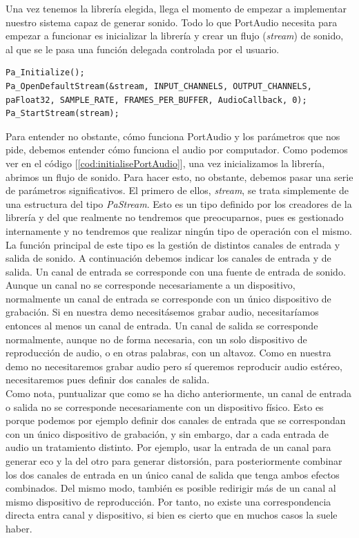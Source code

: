 Una vez tenemos la librería elegida, llega el momento de empezar a implementar nuestro sistema capaz de generar sonido. Todo lo que PortAudio necesita para empezar a funcionar es inicializar la librería y crear un flujo (\emph{stream}) de sonido, al que se le pasa una función delegada controlada por el usuario.\\

\begin{lstlisting}[style=C-color, caption={Código necesario para inicializar PortAudio},label=cod:initialisePortAudio]
Pa_Initialize();
Pa_OpenDefaultStream(&stream, INPUT_CHANNELS, OUTPUT_CHANNELS, paFloat32, SAMPLE_RATE, FRAMES_PER_BUFFER, AudioCallback, 0);
Pa_StartStream(stream);
\end{lstlisting}

Para entender no obstante, cómo funciona PortAudio y los parámetros que nos pide, debemos entender cómo funciona el audio por computador. Como podemos ver en el código [\ref{cod:initialisePortAudio}], una vez inicializamos la librería, abrimos un flujo de sonido. Para hacer esto, no obstante, debemos pasar una serie de parámetros significativos. El primero de ellos, \emph{stream}, se trata simplemente de una estructura del tipo \emph{PaStream}. Esto es un tipo definido por los creadores de la librería y del que realmente no tendremos que preocuparnos, pues es gestionado internamente y no tendremos que realizar ningún tipo de operación con el mismo. La función principal de este tipo es la gestión de distintos canales de entrada y salida de sonido. A continuación debemos indicar los canales de entrada y de salida. Un canal de entrada se corresponde con una fuente de entrada de sonido. Aunque un canal no se corresponde necesariamente a un dispositivo, normalmente un canal de entrada se corresponde con un único dispositivo de grabación. Si en nuestra demo necesitásemos grabar audio, necesitaríamos entonces al menos un canal de entrada. Un canal de salida se corresponde normalmente, aunque no de forma necesaria, con un solo dispositivo de reproducción de audio, o en otras palabras, con un altavoz. Como en nuestra demo no necesitaremos grabar audio pero sí queremos reproducir audio estéreo, necesitaremos pues definir dos canales de salida.\\

Como nota, puntualizar que como se ha dicho anteriormente, un canal de entrada o salida no se corresponde necesariamente con un dispositivo físico. Esto es porque podemos por ejemplo definir dos canales de entrada que se correspondan con un único dispositivo de grabación, y sin embargo, dar a cada entrada de audio un tratamiento distinto. Por ejemplo, usar la entrada de un canal para generar eco y la del otro para generar distorsión, para posteriormente combinar los dos canales de entrada en un único canal de salida que tenga ambos efectos combinados. Del mismo modo, también es posible redirigir más de un canal al mismo dispositivo de reproducción. Por tanto, no existe una correspondencia directa entra canal y dispositivo, si bien es cierto que en muchos casos la suele haber.\\

